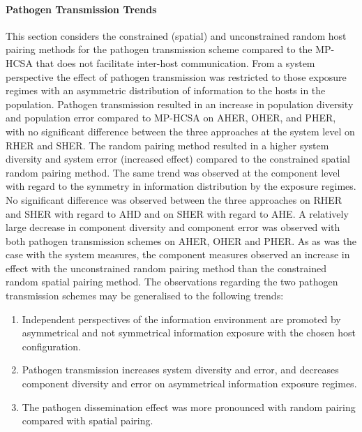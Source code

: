 \paragraph{Pathogen Transmission Trends}
This section considers the constrained (spatial) and unconstrained random host pairing methods for the pathogen transmission scheme compared to the MP-HCSA that does not facilitate inter-host communication. 
From a system perspective the effect of pathogen transmission was restricted to those exposure regimes with an asymmetric distribution of information to the hosts in the population. Pathogen transmission resulted in an increase in population diversity and population error compared to MP-HCSA on AHER, OHER, and PHER, with no significant difference between the three approaches at the system level on RHER and SHER. The random pairing method resulted in a higher system diversity and system error (increased effect) compared to the constrained spatial random pairing method.
The same trend was observed at the component level with regard to the symmetry in information distribution by the exposure regimes. No significant difference was observed between the three approaches on RHER and SHER with regard to AHD and on SHER with regard to AHE. A relatively large decrease in component diversity and component error was observed with both pathogen transmission schemes on AHER, OHER and PHER. As as was the case with the system measures, the component measures observed an increase in effect with the unconstrained random pairing method than the constrained random spatial pairing method.
The observations regarding the two pathogen transmission schemes may be generalised to the following trends: 

\begin{enumerate}
	\item Independent perspectives of the information environment are promoted by asymmetrical and not symmetrical information exposure with the chosen host configuration.
	\item Pathogen transmission increases system diversity and error, and decreases component diversity and error on asymmetrical information exposure regimes.
	\item The pathogen dissemination effect was more pronounced with random pairing compared with spatial pairing.
\end{enumerate}

%
%
